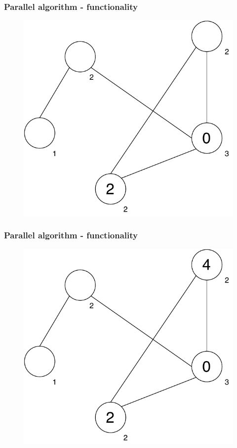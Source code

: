 \documentclass[11pt,xcolor=pdflatex]{beamer}
\begin{document}
\begin{frame}\frametitle{Parallel algorithm - functionality}

\begin{figure}
   \includegraphics[width=0.6\linewidth]{graph_2colored.pdf}
\end{figure}

\end{frame}


\begin{frame}\frametitle{Parallel algorithm - functionality}

\begin{figure}
   \includegraphics[width=0.6\linewidth]{graph_3colored.pdf}
\end{figure}

\end{frame}

\end{document}
